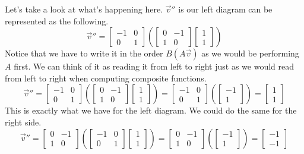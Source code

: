 \documentclass[../main.tex]{subfiles}
\begin{document}
Let's take a look at what's happening here. $\vec{v}''$ is our
left diagram can be represented as the following.
\[
\vec{v}'' =
\begin{bmatrix}
    -1 & 0 \\
    0  & 1
\end{bmatrix}
\left(
\begin{bmatrix}
    0 & -1 \\
    1 & 0
\end{bmatrix}
\begin{bmatrix}
    1 \\
    1
\end{bmatrix}
\right)
\]
Notice that we have to write it in the order $B(A\vec{v})$ as we
would be performing $A$ first. We can think of it as reading it from
left to right just as we would read from left to right when
computing composite functions.
\[
\vec{v}'' =
\begin{bmatrix}
    -1 & 0 \\
    0  & 1
\end{bmatrix}
\left(
\begin{bmatrix}
    0 & -1 \\
    1 & 0
\end{bmatrix}
\begin{bmatrix}
    1 \\
    1
\end{bmatrix}
\right)
=
\begin{bmatrix}
    -1 & 0 \\
    0  & 1
\end{bmatrix}
\left(
\begin{bmatrix}
    -1 \\
    1
\end{bmatrix}
\right)
=
\begin{bmatrix}
    1 \\
    1
\end{bmatrix}
\]
This is exactly what we have for the left diagram. We could do
the same for the right side.
\[
\vec{v}'' =
\begin{bmatrix}
    0 & -1 \\
    1 & 0
\end{bmatrix}
\left(
\begin{bmatrix}
    -1 & 0 \\
    0  & 1
\end{bmatrix}
\begin{bmatrix}
    1 \\
    1
\end{bmatrix}
\right)
=
\begin{bmatrix}
    0 & -1 \\
    1 & 0
\end{bmatrix}
\left(
\begin{bmatrix}
    -1 \\
    1
\end{bmatrix}
\right)
=
\begin{bmatrix}
    -1 \\
    -1
\end{bmatrix}
\]
\end{document}
